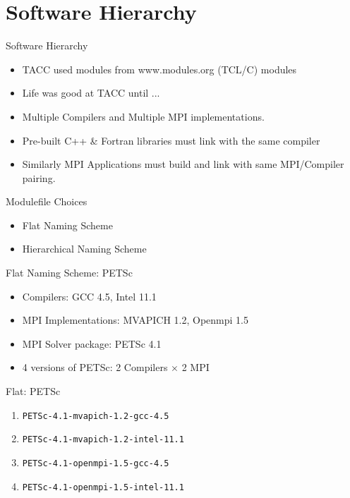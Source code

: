 \documentclass{beamer}
\begin{document}
\section{Software Hierarchy}

\begin{frame}{Software Hierarchy}
  \begin{itemize}
    \item TACC used modules from www.modules.org (TCL/C) modules
    \item Life was good at TACC until ...
    \item Multiple Compilers and Multiple MPI implementations.
    \item Pre-built C++ \& Fortran libraries must link with the same compiler
    \item Similarly MPI Applications must build and link with same
      MPI/Compiler pairing.
  \end{itemize}
\end{frame}

\begin{frame}{Modulefile Choices}
  \begin{itemize}
    \item Flat Naming Scheme
    \item Hierarchical Naming Scheme
  \end{itemize}
\end{frame}

\begin{frame}{Flat Naming Scheme: PETSc}
  \begin{itemize}
    \item Compilers: GCC 4.5, Intel 11.1
    \item MPI Implementations: MVAPICH 1.2, Openmpi 1.5
    \item MPI Solver package: PETSc 4.1
    \item 4 versions of PETSc: 2 Compilers $\times$ 2 MPI 
  \end{itemize}
\end{frame}

\begin{frame}{Flat: PETSc }
  \begin{enumerate}
  \item \texttt{PETSc-4.1-mvapich-1.2-gcc-4.5}
  \item \texttt{PETSc-4.1-mvapich-1.2-intel-11.1}
  \item \texttt{PETSc-4.1-openmpi-1.5-gcc-4.5}
  \item \texttt{PETSc-4.1-openmpi-1.5-intel-11.1}
  \end{enumerate}
\end{frame}
\end{document}
